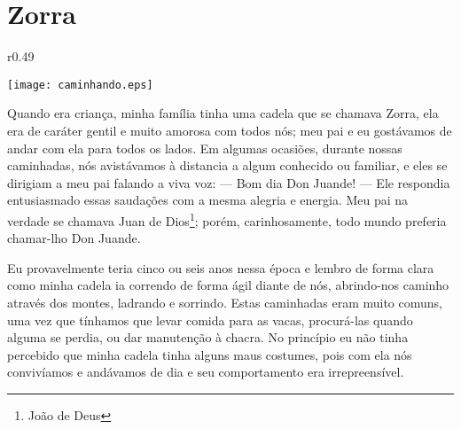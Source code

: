 \cleardoublepage
\newpage
\ifdefined\EnableIncludeImages
\fi
\chapter{Zorra}


\ifdefined\EnableIncludeImages
\begin{wrapfigure}{r}{0.49\textwidth}
  \begin{center}
  \vspace{-30pt}
    \texttt{[image: caminhando.eps]}
  \end{center}
  \vspace{-20pt}
\end{wrapfigure}
\fi
Quando era criança, minha família tinha uma cadela que se chamava Zorra, ela era de caráter gentil e muito amorosa com todos nós; meu pai e eu gostávamos de andar com ela para todos os lados. Em algumas ocasiões, durante nossas caminhadas, nós avistávamos à distancia a algum conhecido ou familiar, e eles se dirigiam a meu pai falando a viva voz: 
--- Bom dia Don Juande! --- 
Ele respondia entusiasmado essas saudações com a mesma alegria e energia.
Meu pai na verdade se chamava Juan de Dios\footnote{João de Deus}; porém, carinhosamente, todo mundo preferia chamar-lho Don Juande.


Eu provavelmente teria cinco ou seis anos nessa época e lembro de forma clara como minha cadela ia correndo de forma ágil diante de nós, abrindo-nos caminho através dos montes, ladrando e sorrindo.
Estas caminhadas eram muito comuns, uma vez que tínhamos que levar comida para as vacas, procurá-las quando alguma se perdia, ou dar manutenção à chacra.
No princípio eu não tinha percebido que minha cadela tinha alguns maus costumes, pois com ela nós convivíamos e andávamos de dia e seu comportamento era irrepreensível. 

